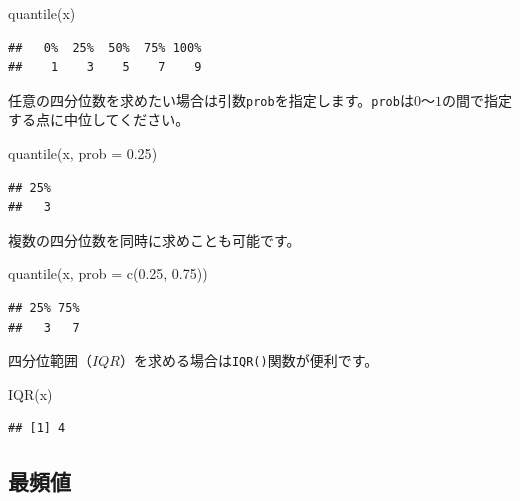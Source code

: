 \documentclass[
  12pt,
]{book}
\newenvironment{Shaded}{\begin{snugshade}}{\end{snugshade}}
\newcommand{\AttributeTok}[1]{\textcolor[rgb]{0.77,0.63,0.00}{#1}}
\newcommand{\FloatTok}[1]{\textcolor[rgb]{0.00,0.00,0.81}{#1}}
\newcommand{\FunctionTok}[1]{\textcolor[rgb]{0.00,0.00,0.00}{#1}}
\newcommand{\NormalTok}[1]{#1}
\begin{document}
\begin{Shaded}
\begin{Highlighting}[numbers=left,,]
\FunctionTok{quantile}\NormalTok{(x)}
\end{Highlighting}
\end{Shaded}

\begin{verbatim}
##   0%  25%  50%  75% 100% 
##    1    3    5    7    9
\end{verbatim}

任意の四分位数を求めたい場合は引数\texttt{prob}を指定します。\texttt{prob}は\(0\)〜\(1\)の間で指定する点に中位してください。

\begin{Shaded}
\begin{Highlighting}[numbers=left,,]
\FunctionTok{quantile}\NormalTok{(x, }\AttributeTok{prob =} \FloatTok{0.25}\NormalTok{)}
\end{Highlighting}
\end{Shaded}

\begin{verbatim}
## 25% 
##   3
\end{verbatim}

複数の四分位数を同時に求めことも可能です。

\begin{Shaded}
\begin{Highlighting}[numbers=left,,]
\FunctionTok{quantile}\NormalTok{(x, }\AttributeTok{prob =} \FunctionTok{c}\NormalTok{(}\FloatTok{0.25}\NormalTok{, }\FloatTok{0.75}\NormalTok{))}
\end{Highlighting}
\end{Shaded}

\begin{verbatim}
## 25% 75% 
##   3   7
\end{verbatim}

四分位範囲（\(IQR\)）を求める場合は\texttt{IQR()}関数が便利です。

\begin{Shaded}
\begin{Highlighting}[numbers=left,,]
\FunctionTok{IQR}\NormalTok{(x)}
\end{Highlighting}
\end{Shaded}

\begin{verbatim}
## [1] 4
\end{verbatim}

\hypertarget{ux6700ux983bux5024}{%
\subsection{最頻値}\label{ux6700ux983bux5024}}
\end{document}
